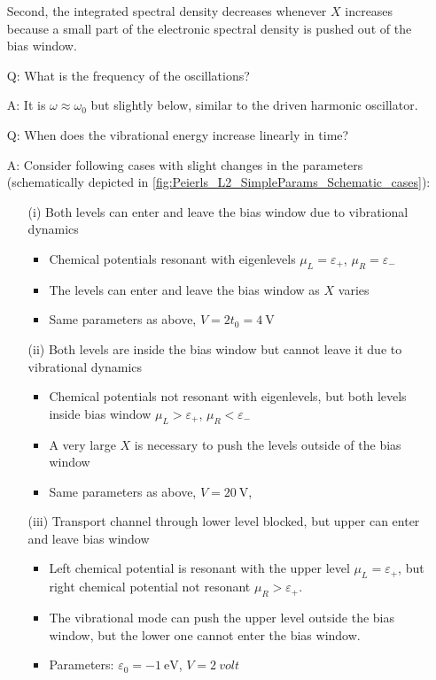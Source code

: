 \documentclass{article}
\begin{document}
\begin{itemize}
	Second, the integrated spectral density decreases whenever $X$ increases because a small part of the electronic spectral density is pushed out of the bias window. 
	\item[Q:] What is the frequency of the oscillations?
	\item[A:] It is $\omega\approx \omega_0$ but slightly below, similar to the driven harmonic oscillator.
	\item[Q:] When does the vibrational energy increase linearly in time?
	\item[A:] Consider following cases with slight changes in the parameters (schematically depicted in \cref{fig:Peierls_L2_SimpleParams_Schematic_cases}):
	\begin{itemize}
		\item[(i)] Both levels can enter and leave the bias window due to vibrational dynamics
		\begin{itemize}
			\item Chemical potentials resonant with eigenlevels $\mu_L=\varepsilon_+$, $\mu_R= \varepsilon_-$
			\item The levels can enter and leave the bias window as $X$ varies
			\item Same parameters as above, $V=2t_0 = \SI{4}{\volt}$
		\end{itemize}  
		\item[(ii)] Both levels are inside the bias window but cannot leave it due to vibrational dynamics
		\begin{itemize}
			\item Chemical potentials not resonant with eigenlevels, but both levels inside bias window $\mu_L>\varepsilon_+$, $\mu_R< \varepsilon_-$
			\item A very large $X$ is necessary to push the levels outside of the bias window
			\item Same parameters as above, $V=\SI{20}{\volt}$,
		\end{itemize}
		\item[(iii)] Transport channel through lower level blocked, but upper can enter and leave bias window
		\begin{itemize}
			\item Left chemical potential is resonant with the upper level $\mu_L=\varepsilon_+$, but right chemical potential not resonant $\mu_R>\varepsilon_+$. 
			\item The vibrational mode can push the upper level outside the bias window, but the lower one cannot enter the bias window.
			\item Parameters: $\varepsilon_0 = -\SI{1}{\electronvolt}$, $V=\SI{2}{volt}$

\end{itemize}
\end{itemize}
\end{itemize}
\end{document}
